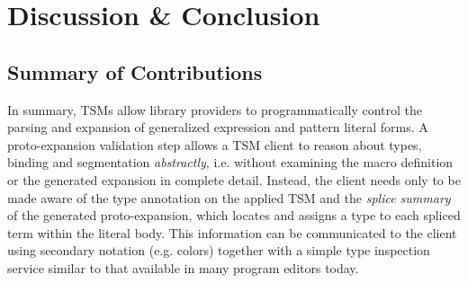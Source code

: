 \chapter{Discussion \& Conclusion}\label{chap:conclusion}


\vspace{-4px}
\section{Summary of Contributions}

In summary, TSMs allow library providers to programmatically control the parsing and expansion of generalized expression and pattern literal forms. A proto-expansion validation step allows a TSM client to reason about types, binding and segmentation \emph{abstractly}, i.e. without examining the macro definition or the generated expansion in complete detail. Instead, the client needs only to be made aware of the type annotation on the applied TSM and the \emph{splice summary} of the generated proto-expansion, which locates and assigns a type to each spliced term within the literal body. This information can be communicated to the client using secondary notation (e.g. colors) together with a simple type inspection service similar to that available in many program editors today.

